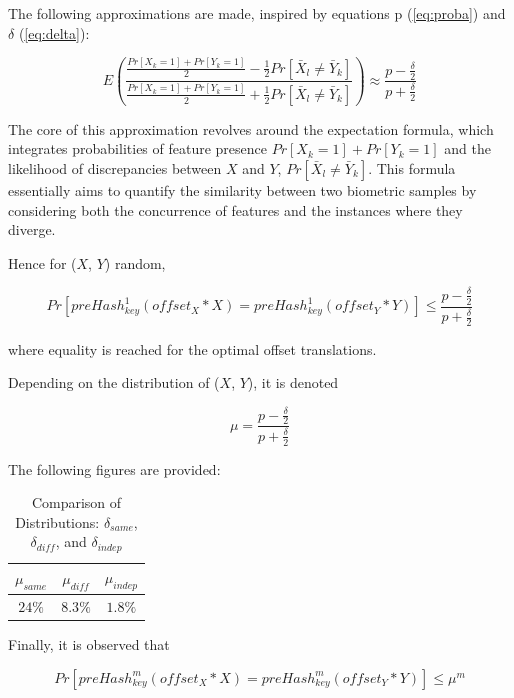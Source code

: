 The following approximations are made, inspired by equations p (\ref{eq:proba}) and $\delta$ (\ref{eq:delta}):

\begin{equation}
    E\left(\frac{\frac{Pr[X_k = 1] + Pr[Y_k = 1]}{2} - \frac{1}{2}Pr[\bar{X}_l \neq \bar{Y}_k]}{\frac{Pr[X_k = 1] + Pr[Y_k = 1]}{2} + \frac{1}{2}Pr[\bar{X}_l \neq \bar{Y}_k]}\right) \approx \frac{p - \frac{\delta}{2}}{p + \frac{\delta}{2}}
\end{equation}

The core of this approximation revolves around the expectation formula, which integrates probabilities of feature presence \(Pr[X_k=1]+Pr[Y_k=1]\) and the likelihood of discrepancies between \(X\) and \(Y\), \(Pr[\bar{X}_l \neq \bar{Y}_k]\). This formula essentially aims to quantify the similarity between two biometric samples by considering both the concurrence of features and the instances where they diverge.

Hence for (\(X\), \(Y\)) random,

\begin{equation}
    Pr[preHash_{key}^1(offset_X * X) = preHash_{key}^1(offset_Y * Y)] \leq \frac{p - \frac{\delta}{2}}{p + \frac{\delta}{2}}
\end{equation}

where equality is reached for the optimal offset translations. 

Depending on the distribution of (\(X\), \(Y\)), it is denoted

\begin{equation} \label{eq:mu}
    \mu = \frac{p - \frac{\delta}{2}}{p + \frac{\delta}{2}}
\end{equation}

The following figures are provided:

\begin{table}[H]
    \centering
    \renewcommand{\arraystretch}{1.25}\begin{tabular}{|c|c|c|}
        \hline
        $\mu_{same}$ & $\mu_{diff}$ & $\mu_{indep}$\\
        \hline
        $24\%$ & $8.3\%$ & $1.8\%$\\
        \hline
    \end{tabular}
\caption{Comparison of Distributions: $\delta_{same}$, $\delta_{diff}$, and $\delta_{indep}$}
\end{table}

Finally, it is observed that

\begin{equation}
    Pr[preHash_{key}^m(offset_X * X) = preHash_{key}^m(offset_Y * Y)] \leq \mu^m
\end{equation}

